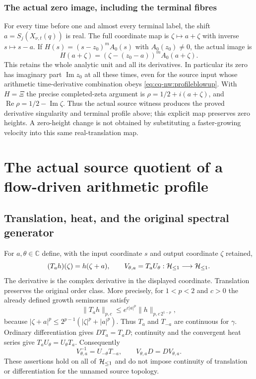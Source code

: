 \subsubsection{The actual zero image, including the terminal fibres}

For every time before one and almost every terminal label, the shift
$a=S_j(X_{\nu,t}(q))$ is real. The full coordinate map is
$\zeta\mapsto a+\zeta$ with inverse $s\mapsto s-a$. If
$H(s)=(s-z_0)^mA_0(s)$ with $A_0(z_0)\ne0$, the actual image is
\[
 H(a+\zeta)=(\zeta-(z_0-a))^mA_0(a+\zeta).
\]
This retains the whole analytic unit and all its derivatives. In
particular its zero has imaginary part $\operatorname{Im}z_0$ at all
these times, even for the source input whose arithmetic time-derivative
combination obeys \eqref{eq:cq-nw:profileblowup}. With $H=\Xi$ the precise
completed-zeta argument is $\rho=1/2+i(a+\zeta)$, and
$\operatorname{Re}\rho=1/2-\operatorname{Im}\zeta$. Thus the actual
source witness produces the proved derivative singularity and terminal
profile above; this explicit map preserves zero heights. A zero-height
change is not obtained by substituting a faster-growing velocity into
this same real-translation map.

\section{The actual source quotient of a flow-driven arithmetic profile}
\label{sec:cq-flow-source-quotient}

\subsection{Translation, heat, and the original spectral generator}

For $a,\theta\in\mathbb C$ define, with the input coordinate $s$ and
output coordinate $\zeta$ retained,
\[
 (T_ah)(\zeta)=h(\zeta+a),\qquad
 V_{\theta,a}=T_aU_\theta:\mathcal H_{\leq 1}\longrightarrow\mathcal H_{\leq 1}.
\]
The derivative is the complex derivative in the displayed coordinate.
Translation preserves the original order class. More precisely, for
$1<p<2$ and $c>0$ the already defined growth seminorms satisfy
\[
 \|T_ah\|_{p,c}\leq
 e^{c|a|^p}\|h\|_{p,c\,2^{1-p}},
\]
because $|\zeta+a|^p\leq2^{p-1}(|\zeta|^p+|a|^p)$.
Thus $T_a$ and $T_{-a}$ are continuous for $\gamma$. Ordinary
differentiation gives $DT_a=T_aD$; continuity and the convergent
heat series give $T_aU_\theta=U_\theta T_a$. Consequently
\[
 V_{\theta,a}^{-1}=U_{-\theta}T_{-a},\qquad
 V_{\theta,a}D=DV_{\theta,a}.
\]
These assertions hold on all of $\mathcal H_{\leq 1}$ and do not impose continuity
of translation or differentiation for the unnamed source topology.

